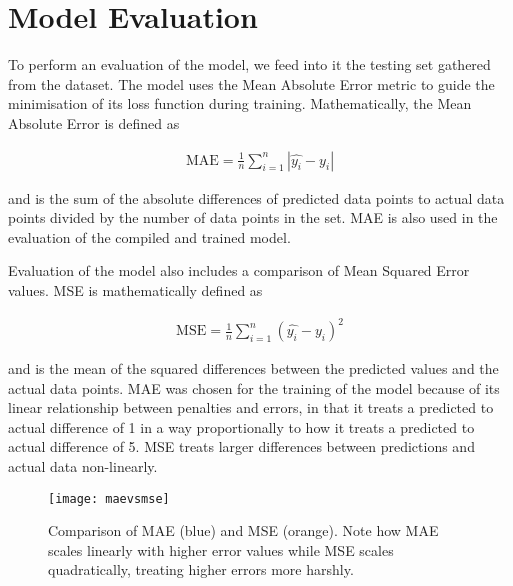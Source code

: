 \section{Model Evaluation}
To perform an evaluation of the model, we feed into it the testing set gathered from the dataset. The model uses the Mean Absolute Error metric to guide the minimisation of its loss function during training. Mathematically, the Mean Absolute Error is defined as

\begin{align}
    \text{MAE} = \frac{1}{n} \sum\limits_{i=1}^{n} {|\hat{y_i} - y_i|}
\end{align}

and is the sum of the absolute differences of predicted data points to actual data points divided by the number of data points in the set. MAE is also used in the evaluation of the compiled and trained model.

Evaluation of the model also includes a comparison of Mean Squared Error values. MSE is mathematically defined as

\begin{align}
    \text{MSE} = \frac{1}{n} \sum\limits_{i=1}^{n} {(\hat{y_i} - y_i)^2}    
\end{align}

and is the mean of the squared differences between the predicted values and the actual data points. MAE was chosen for the training of the model because of its linear relationship between penalties and errors, in that it treats a predicted to actual difference of 1 in a way proportionally to how it treats a predicted to actual difference of 5. MSE treats larger differences between predictions and actual data non-linearly. 

\begin{figure}[H]
    \centering
    \texttt{[image: maevsmse]}
    \caption{Comparison of MAE (blue) and MSE (orange). Note how MAE scales linearly with higher error values while MSE scales quadratically, treating higher errors more harshly.}
    \label{tab:maevsmse}
\end{figure}